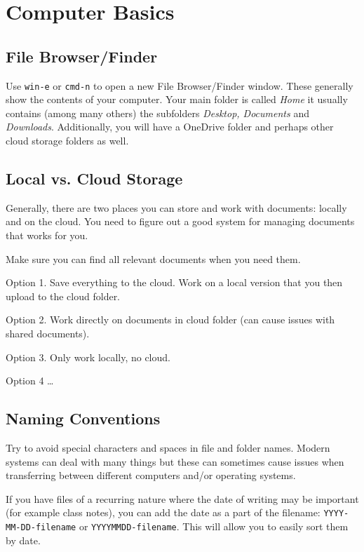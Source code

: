 \documentclass[11pt,a4paper]{report}
\begin{document}
\section{Computer Basics}

\subsection{File Browser/Finder}

Use \verb|win-e| or \verb|cmd-n| to open a new File Browser/Finder window.  These generally show the contents of your computer. Your main folder is called  \emph{Home} it usually contains (among many others) the subfolders \emph{Desktop, Documents} and \emph{Downloads}. Additionally, you will have a OneDrive folder and perhaps other cloud storage folders as well.

\begin{multicols}{2}

\end{multicols}

\subsection{Local vs. Cloud Storage}
Generally, there are two places you can store and work with documents: locally and on the cloud. You need to figure out a good system for managing documents that works for you. 

Make sure you can find all relevant documents when you need them.

Option 1. Save everything to the cloud. Work on a local version that you then upload to the cloud folder. 

Option 2. Work directly on documents in cloud folder (can cause issues with shared documents).

Option 3. Only work locally, no cloud. 

Option 4 \ldots

\subsection{Naming Conventions}
Try to avoid special characters and spaces in file and folder names. Modern systems can deal with many things but these can sometimes cause issues when transferring between different computers and/or operating systems.

If you have files of a recurring nature where the date of writing may be important (for example class notes), you can add the date as a part of the filename: \verb|YYYY-MM-DD-filename| or \verb|YYYYMMDD-filename|. This will allow you to easily sort them by date.
\end{document}
